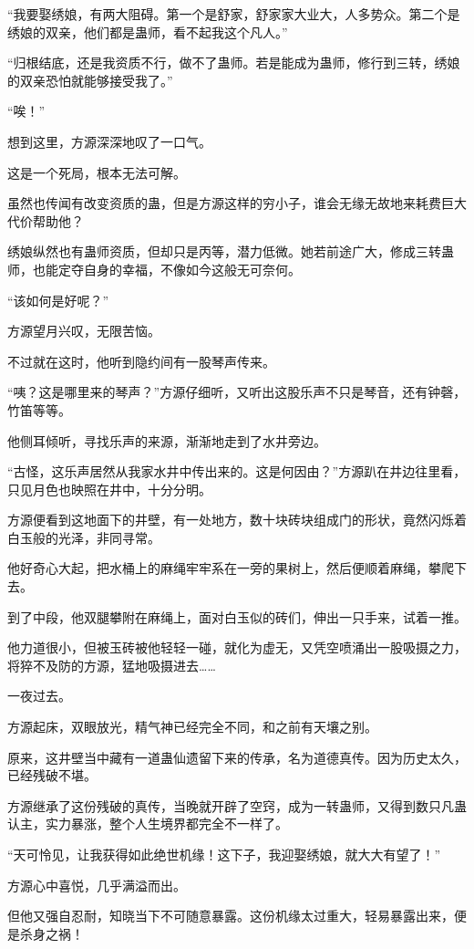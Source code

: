 \begin{this_body}
“我要娶绣娘，有两大阻碍。第一个是舒家，舒家家大业大，人多势众。第二个是绣娘的双亲，他们都是蛊师，看不起我这个凡人。”

“归根结底，还是我资质不行，做不了蛊师。若是能成为蛊师，修行到三转，绣娘的双亲恐怕就能够接受我了。”

“唉！”

想到这里，方源深深地叹了一口气。

这是一个死局，根本无法可解。

虽然也传闻有改变资质的蛊，但是方源这样的穷小子，谁会无缘无故地来耗费巨大代价帮助他？

绣娘纵然也有蛊师资质，但却只是丙等，潜力低微。她若前途广大，修成三转蛊师，也能定夺自身的幸福，不像如今这般无可奈何。

“该如何是好呢？”

方源望月兴叹，无限苦恼。

不过就在这时，他听到隐约间有一股琴声传来。

“咦？这是哪里来的琴声？”方源仔细听，又听出这股乐声不只是琴音，还有钟磬，竹笛等等。

他侧耳倾听，寻找乐声的来源，渐渐地走到了水井旁边。

“古怪，这乐声居然从我家水井中传出来的。这是何因由？”方源趴在井边往里看，只见月色也映照在井中，十分分明。

方源便看到这地面下的井壁，有一处地方，数十块砖块组成门的形状，竟然闪烁着白玉般的光泽，非同寻常。

他好奇心大起，把水桶上的麻绳牢牢系在一旁的果树上，然后便顺着麻绳，攀爬下去。

到了中段，他双腿攀附在麻绳上，面对白玉似的砖们，伸出一只手来，试着一推。

他力道很小，但被玉砖被他轻轻一碰，就化为虚无，又凭空喷涌出一股吸摄之力，将猝不及防的方源，猛地吸摄进去……

一夜过去。

方源起床，双眼放光，精气神已经完全不同，和之前有天壤之别。

原来，这井壁当中藏有一道蛊仙遗留下来的传承，名为道德真传。因为历史太久，已经残破不堪。

方源继承了这份残破的真传，当晚就开辟了空窍，成为一转蛊师，又得到数只凡蛊认主，实力暴涨，整个人生境界都完全不一样了。

“天可怜见，让我获得如此绝世机缘！这下子，我迎娶绣娘，就大大有望了！”

方源心中喜悦，几乎满溢而出。

但他又强自忍耐，知晓当下不可随意暴露。这份机缘太过重大，轻易暴露出来，便是杀身之祸！


\end{this_body}
